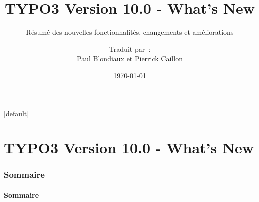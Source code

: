 \documentclass[t]{beamer}
\title{TYPO3 Version 10.0 - What's New}
\subtitle{Résumé des nouvelles fonctionnalités, changements et améliorations}
\author{
	\centerline{Traduit par~:}
	\centerline{Paul Blondiaux et Pierrick Caillon}
}
\date{\today}
\begin{document}
\sharefont


\begingroup
	[default]
	\begin{frame}
		\titlepage
	\end{frame}
\endgroup


\section*{TYPO3 Version 10.0 - What's New}
\begin{frame}[fragile]
	\frametitle{Sommaire}
	\framesubtitle{Sommaire}

	\tableofcontents

\end{frame}











%

\end{document}
